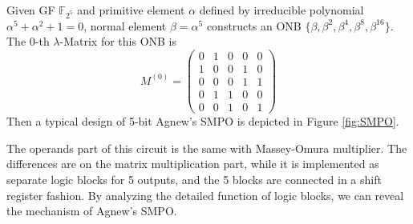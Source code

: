 \begin{Example}
Given GF $\mathbb F_{2^5}$ and primitive element $\alpha$ defined by irreducible polynomial 
$\alpha^5+\alpha^2+1=0$, normal element $\beta = \alpha^5$ constructs an ONB $\{\beta,\beta^2,\beta^4,\beta^8,\beta^{16}\}$.
The $0$-th $\lambda$-Matrix for this ONB is
\begin{equation*}
M^{(0)} = \left(\begin{array}{lcccr}
0 &1 &0 &0 &0 \\
1 &0 &0 &1 &0 \\
0 &0 &0 &1 &1 \\
0 &1 &1 &0 &0 \\
0 &0 &1 &0 &1
\end{array}\right)
\end{equation*}
Then a typical design of 5-bit Agnew's SMPO is depicted in Figure \ref{fig:SMPO}.

\begin{figure}[bp]
\end{figure}

The operands part of this circuit is the same with Massey-Omura multiplier. The differences are on 
the matrix multiplication part, while it is implemented as separate logic blocks for 5 outputs,
and the 5 blocks are connected in a shift register fashion. By analyzing the detailed function of 
logic blocks, we can reveal the mechanism of Agnew's SMPO.


\end{Example}
